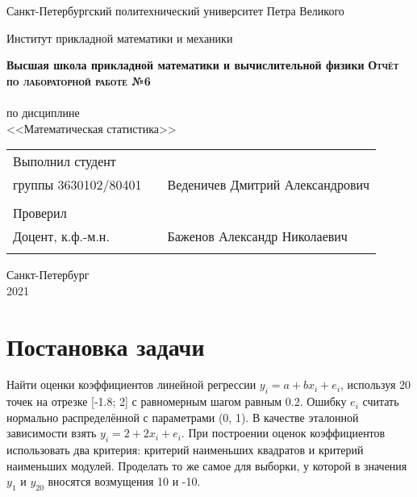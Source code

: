 \documentclass{article}
\begin{document}
\begin{titlepage}
  \begin{center}
    \large
    Санкт-Петербургский политехнический университет Петра Великого
    
    Институт прикладной математики и механики
    
    \textbf{Высшая школа прикладной математики и вычислительной физики}
    \vfill
    \textsc{\textbf{\Large{Отчёт по лабораторной работе №6}}}\\[5mm]
    \\ по дисциплине
    \\ <<Математическая статистика>>\\
\end{center}

\vfill

\begin{tabular}{l p{} l}
Выполнил студент \\группы 3630102/80401 && Веденичев Дмитрий Александрович \\
\\
Проверил\\Доцент, к.ф.-м.н.& \hspace{0pt} &   Баженов Александр Николаевич \\\\
\end{tabular}

\hfill \break
\hfill \break
\begin{center} Санкт-Петербург \\2021 \end{center}
\thispagestyle{empty}
\end{titlepage}
\newpage
\newpage
\begin{center}
    \setcounter{page}{2}
    \tableofcontents
\end{center}
\newpage
\begin{center}
    \setcounter{page}{3}
    \listoffigures
\end{center}

\newpage
\section{Постановка задачи}
\noindent Найти оценки коэффициентов линейной регрессии $y_{i} = a + bx_{i} + e_{i}$, используя 20 точек на отрезке [-1.8; 2] с равномерным шагом равным 0.2. Ошибку $e_{i}$ считать нормально распределённой с параметрами (0, 1). В качестве эталонной зависимости взять $y_{i} = 2 + 2x_{i} + e_{i}$. При построении оценок коэффициентов использовать два критерия: критерий наименьших квадратов и критерий наименьших модулей. Проделать то же самое для выборки, у которой в значения $y_{1}$ и $y_{20}$ вносятся возмущения 10 и -10. 
\end{document}
